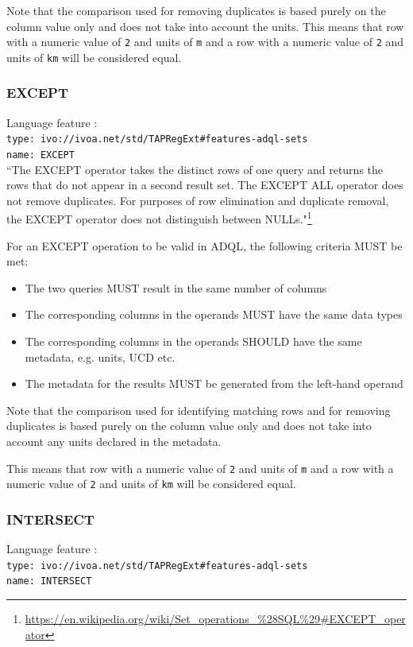 \documentclass[11pt,a4paper]{ivoa}
\begin{document}
Note that the comparison used for removing duplicates is based purely on the
column value only and does not take into account the units.
This means that row with a numeric value of \verb:2: and units of \verb:m:
and a row with a numeric value of \verb:2: and units of \verb:km: will be
considered equal.

\subsubsection{EXCEPT}
{\footnotesize Language feature :}\\
{\footnotesize \verb|type: ivo://ivoa.net/std/TAPRegExt#features-adql-sets|}\\
{\footnotesize \verb|name: EXCEPT|}\\

``The EXCEPT operator takes the distinct rows of one query and returns the
rows that do not appear in a second result set. The EXCEPT ALL operator
does not remove duplicates. For purposes of row elimination and duplicate
removal, the EXCEPT operator does not distinguish between NULLs."\footnote{\url{https://en.wikipedia.org/wiki/Set\_operations\_\%28SQL\%29\#EXCEPT\_operator}}

For an EXCEPT operation to be valid in ADQL, the following criteria MUST be met:

\begin{itemize}
    \item The two queries MUST result in the same number of columns
    \item The corresponding columns in the operands MUST have the same data types
    \item The corresponding columns in the operands SHOULD have the same metadata, e.g. units, UCD etc.
    \item The metadata for the results MUST be generated from the left-hand operand
\end{itemize}

Note that the comparison used for identifying matching rows and for removing
duplicates is based purely on the column value only and does not take into
account any units declared in the metadata.

This means that row with a numeric value of \verb:2: and units of \verb:m:
and a row with a numeric value of \verb:2: and units of \verb:km: will be
considered equal.

\subsubsection{INTERSECT}
{\footnotesize Language feature :}\\
{\footnotesize \verb|type: ivo://ivoa.net/std/TAPRegExt#features-adql-sets|}\\
{\footnotesize \verb|name: INTERSECT|}\\
\end{document}
